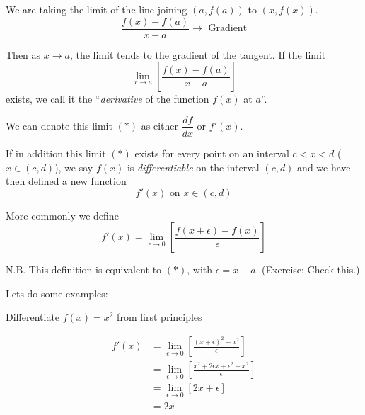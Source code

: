 \documentclass[twoside]{scrartcl}
\begin{document}
We are taking the limit of the line joining $(a, f(a))$ to $(x,f(x))$. 
\[\frac{f(x) - f(a)}{x-a} \to \text{ Gradient}\]

\begin{definition}Then as $x \to a$, the limit tends to the gradient of the tangent. If the limit 
\[\lim_{x \to a} \left[\frac{f(x) - f(a)}{x-a}\right] \tag{$*$}\]
exists, we call it the ``\emph{derivative} of the function $f(x)$ at $a$''. 	
\end{definition}

We can denote this limit $(*)$ as either $\dfrac{df}{dx}$ or $f'(x)$. 

If in addition this limit $(*)$ exists for every point on an interval $ c < x < d$ ($x \in (c,d)$), we say $f(x)$ is \emph{differentiable} on the interval $(c,d)$ and we have then defined a new function
\[f'(x) \text{ on } x \in (c,d)\]

\begin{definition}
More commonly we define 
\[f'(x) = \lim_{\epsilon \to 0} \left[\frac{f(x+\epsilon) - f(x)}{\epsilon}\right]\]	
\end{definition}

N.B. This definition is equivalent to $(*)$, with $\epsilon = x-a$. (Exercise: Check this.)

Lets do some examples: 

\begin{example}
Differentiate $f(x) = x^2$ from first principles

\[
\begin{aligned}
  f'(x) &= \lim_{\epsilon \to 0}\left[\frac{(x+\epsilon)^2 - x^2}{\epsilon}\right]\\
  &= \lim_{\epsilon \to 0}\left[\frac{x^2 + 2\epsilon x + \epsilon^2 - x^2}{\epsilon}\right]\\
  &= \lim_{\epsilon \to 0}[2x + \epsilon]\\
  &= 2x
\end{aligned}
\]	
\end{example}\vspace*{5pt}
\end{document}
